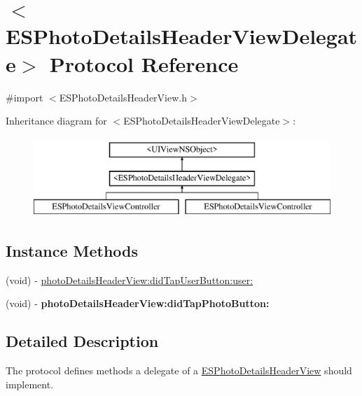 \hypertarget{protocol_e_s_photo_details_header_view_delegate-p}{}\section{$<$E\+S\+Photo\+Details\+Header\+View\+Delegate$>$ Protocol Reference}
\label{protocol_e_s_photo_details_header_view_delegate-p}


{\ttfamily \#import $<$E\+S\+Photo\+Details\+Header\+View.\+h$>$}

Inheritance diagram for $<$E\+S\+Photo\+Details\+Header\+View\+Delegate$>$\+:\begin{figure}[H]
\begin{center}
\leavevmode
\includegraphics[height=3.000000cm]{protocol_e_s_photo_details_header_view_delegate-p}
\end{center}
\end{figure}
\subsection*{Instance Methods}
\begin{DoxyCompactItemize}
\item 
(void) -\/ \hyperlink{protocol_e_s_photo_details_header_view_delegate-p_a394f2b872fcc4d7814ce931ce83004de}{photo\+Details\+Header\+View\+:did\+Tap\+User\+Button\+:user\+:}
\item 
\hypertarget{protocol_e_s_photo_details_header_view_delegate-p_afa2f2af06b164cfac7f429ee83bcb6fc}{}(void) -\/ {\bfseries photo\+Details\+Header\+View\+:did\+Tap\+Photo\+Button\+:}\label{protocol_e_s_photo_details_header_view_delegate-p_afa2f2af06b164cfac7f429ee83bcb6fc}

\end{DoxyCompactItemize}


\subsection{Detailed Description}
The protocol defines methods a delegate of a \hyperlink{interface_e_s_photo_details_header_view}{E\+S\+Photo\+Details\+Header\+View} should implement. 


